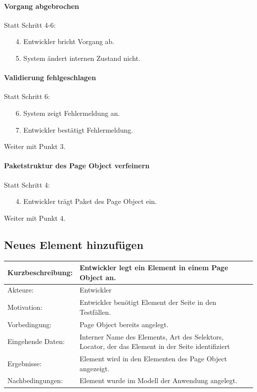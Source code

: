 \paragraph{Vorgang abgebrochen}
Statt Schritt 4-6:
\begin{itemize}[itemsep=0pt]
\item[4.] Entwickler bricht Vorgang ab. 
\item[5.] System ändert internen Zustand nicht. 
\end{itemize}

\paragraph{Validierung fehlgeschlagen}
Statt Schritt 6:
\begin{itemize}[itemsep=0pt]
\item[6.] System zeigt Fehlermeldung an. 
\item[7.] Entwickler bestätigt Fehlermeldung. 
\end{itemize}
Weiter mit Punkt 3. 

\paragraph{Paketstruktur des Page Object verfeinern}
Statt Schritt 4:
\begin{itemize}[itemsep=0pt]
\item[4.] Entwickler trägt Paket des Page Object ein.
\end{itemize}
Weiter mit Punkt 4. 
 

\subsection{Neues Element hinzufügen}
\label{sec:neues_element_hinzufügen}

\begin{tabular}[h]{|p{4cm}|p{}|}
\hline 
\rule[-1ex]{0pt}{2.5ex}Kurzbeschreibung: & 
Entwickler legt ein Element in einem Page Object an. \\  
\hline 
\rule[-1ex]{0pt}{2.5ex}Akteure: & 
Entwickler \\ 
\hline 
\rule[-1ex]{0pt}{2.5ex}Motivation: & 
Entwickler benötigt Element der Seite in den Testfällen. \\ 
\hline 
\rule[-1ex]{0pt}{2.5ex}Vorbedingung: & 
Page Object bereits angelegt.\\ 
\hline 
\rule[-1ex]{0pt}{2.5ex}Eingehende Daten: & Interner Name des Elements, Art des Selektors, Locator, der das Element in der Seite identifiziert \\ 
\hline 
\rule[-1ex]{0pt}{2.5ex}Ergebnisse: & Element wird in den Elementen des Page Object angezeigt. \\ 
\hline 
\rule[-1ex]{0pt}{2.5ex}Nachbedingungen: & Element wurde im Modell der Anwendung angelegt.  \\ 
\hline 
\end{tabular} 

